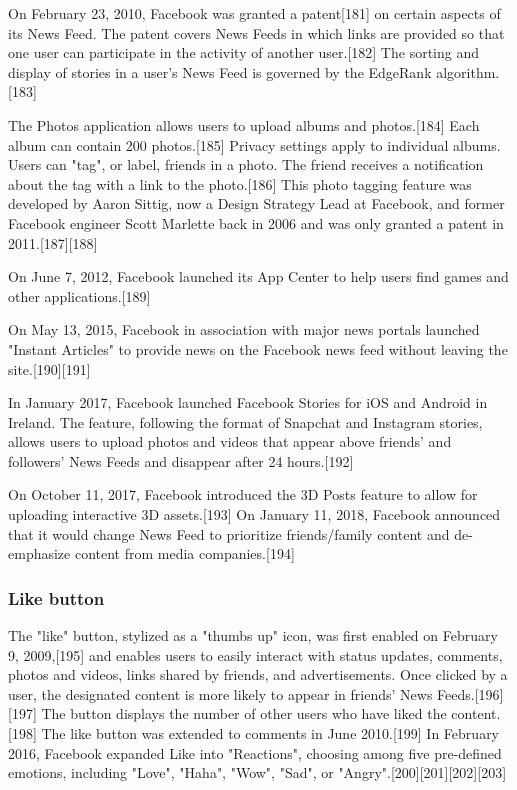 \documentclass[12pt]{article}
\begin{document}
On February 23, 2010, Facebook was granted a patent[181] on certain aspects of its News Feed. The patent covers News Feeds in which links are provided so that one user can participate in the activity of another user.[182] The sorting and display of stories in a user's News Feed is governed by the EdgeRank algorithm.[183]

The Photos application allows users to upload albums and photos.[184] Each album can contain 200 photos.[185] Privacy settings apply to individual albums. Users can "tag", or label, friends in a photo. The friend receives a notification about the tag with a link to the photo.[186] This photo tagging feature was developed by Aaron Sittig, now a Design Strategy Lead at Facebook, and former Facebook engineer Scott Marlette back in 2006 and was only granted a patent in 2011.[187][188]

On June 7, 2012, Facebook launched its App Center to help users find games and other applications.[189]

On May 13, 2015, Facebook in association with major news portals launched "Instant Articles" to provide news on the Facebook news feed without leaving the site.[190][191]

In January 2017, Facebook launched Facebook Stories for iOS and Android in Ireland. The feature, following the format of Snapchat and Instagram stories, allows users to upload photos and videos that appear above friends' and followers' News Feeds and disappear after 24 hours.[192]

On October 11, 2017, Facebook introduced the 3D Posts feature to allow for uploading interactive 3D assets.[193] On January 11, 2018, Facebook announced that it would change News Feed to prioritize friends/family content and de-emphasize content from media companies.[194] 





\subsubsection{Like button}


The "like" button, stylized as a "thumbs up" icon, was first enabled on February 9, 2009,[195] and enables users to easily interact with status updates, comments, photos and videos, links shared by friends, and advertisements. Once clicked by a user, the designated content is more likely to appear in friends' News Feeds.[196][197] The button displays the number of other users who have liked the content.[198] The like button was extended to comments in June 2010.[199] In February 2016, Facebook expanded Like into "Reactions", choosing among five pre-defined emotions, including "Love", "Haha", "Wow", "Sad", or "Angry".[200][201][202][203]
\end{document}
